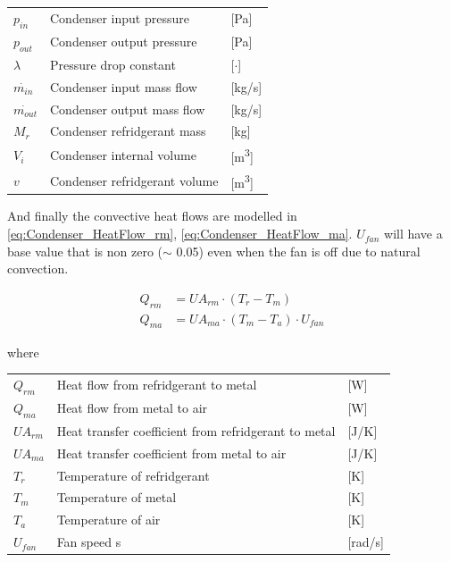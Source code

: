 \begin{center}
	\begin{tabular}{l p{8cm} l}
		$p_{in}$				&	Condenser input pressure					& [\si{Pa}] \\
		$p_{out}$				&	Condenser output pressure					& [\si{Pa}] \\
		$\lambda$				& 	Pressure drop constant	 					& [$\cdot$] \\
		$\dot{m_{in}}$			& 	Condenser input mass flow 					& [\si{kg}/\si{s}] \\
		$\dot{m_{out}}$			& 	Condenser output mass flow 					& [\si{kg}/\si{s}] \\	
		$M_{r}$					&	Condenser refridgerant mass					& [\si{kg}] \\
		$V_{i}$					&	Condenser internal volume					& [\si{m^3}] \\
		$v$						&	Condenser refridgerant volume				& [\si{m^3}] \\
	\end{tabular}
\end{center}


And finally the convective heat flows are modelled in \cref{eq:Condenser_HeatFlow_rm}, \cref{eq:Condenser_HeatFlow_ma}. $ U_{fan}	 $ will have a base value that is non zero ($ \sim $ 0.05) even when the fan is off due to natural convection. 

\begin{align}
	Q_{rm}	 			& = U A_{rm} \cdot (T_r - T_m)							\label{eq:Condenser_HeatFlow_rm}\\
	Q_{ma}	 			& = U A_{ma} \cdot (T_m - T_a)\cdot U_{fan}				\label{eq:Condenser_HeatFlow_ma}
\end{align}	

where 

\begin{center}
	\begin{tabular}{l p{8cm} l}
		$Q_{rm}$				&	Heat flow from refridgerant to metal					& [\si{W}] \\
		$Q_{ma}$				&	Heat flow from metal to air								& [\si{W}] \\
		$U A_{rm}$				& 	Heat transfer coefficient from refridgerant to metal 	& [\si{J}/\si{K}] \\
		$U A_{ma}$				& 	Heat transfer coefficient from metal to air				& [\si{J}/\si{K}] \\
		$T_r$					& 	Temperature of refridgerant 							& [\si{K}] \\	
		$T_m$					&	Temperature of metal 									& [\si{K}] \\
		$T_a$					&	Temperature of air 										& [\si{K}] \\
		$U_{fan}$				&	Fan speed											s	& [\si{rad}/\si{s}] \\
	\end{tabular}
\end{center}



